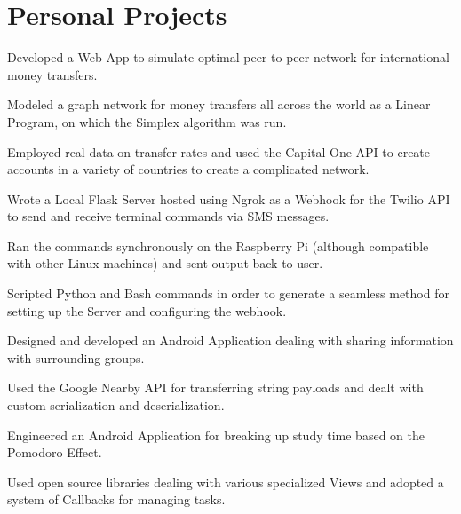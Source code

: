 \documentclass[]{format}
\begin{document}
\begin{minipage}[t]{0.66\textwidth}

\section{Personal Projects}
\begin{tightemize}
\item Developed a Web App to simulate optimal peer-to-peer network for international money transfers.
\item Modeled a graph network for money transfers all across the world as a Linear Program, on which the Simplex algorithm was run.
\item Employed real data on transfer rates and used the Capital One API to create accounts in a variety of countries to create a complicated network.
\end{tightemize}
\sectionsep

\begin{tightemize}
\item Wrote a Local Flask Server hosted using Ngrok as a Webhook for the Twilio API to send and receive terminal commands via SMS messages.
\item Ran the commands synchronously on the Raspberry Pi (although compatible with other Linux machines) and sent output back to user.
\item Scripted Python and Bash commands in order to generate a seamless method for setting up the Server and configuring the webhook.
\end{tightemize}
\sectionsep

\begin{tightemize}
\item Designed and developed an Android Application dealing with sharing information with surrounding groups. 
\item Used the Google Nearby API for transferring string payloads and dealt with custom serialization and deserialization.
\end{tightemize}
\sectionsep

\begin{tightemize}
\item Engineered an Android Application for breaking up study time based on the Pomodoro Effect.
\item Used open source libraries dealing with various specialized Views and adopted a system of Callbacks for managing tasks.
\end{tightemize}
\end{minipage} 
\end{document}
